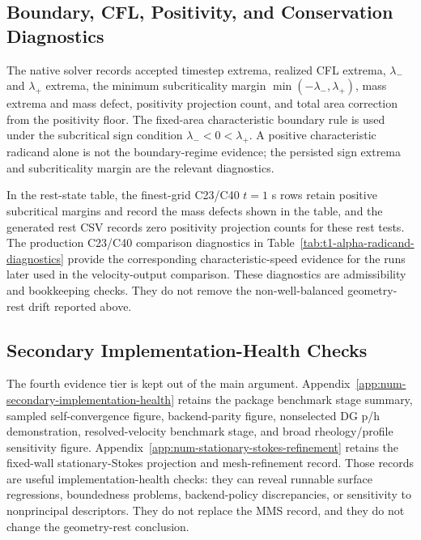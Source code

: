 \subsection{Boundary, CFL, Positivity, and Conservation Diagnostics}
\label{subsec:boundary-diagnostics}

The native solver records accepted timestep extrema, realized CFL extrema,
$\lambda_-$ and $\lambda_+$ extrema, the minimum subcriticality margin
$\min(-\lambda_-,\lambda_+)$, mass extrema and mass defect, positivity
projection count, and total area correction from the positivity floor. The
fixed-area characteristic boundary rule is used under the subcritical sign
condition $\lambda_-<0<\lambda_+$. A positive characteristic radicand alone is
not the boundary-regime evidence; the persisted sign extrema and subcriticality
margin are the relevant diagnostics.

In the rest-state table, the finest-grid C23/C40 $t=1$ s rows retain
positive subcritical margins and record the mass defects shown in the table, and the generated rest CSV records zero positivity projection counts for
these rest tests. The production C23/C40
comparison diagnostics in Table~\ref{tab:t1-alpha-radicand-diagnostics} provide
the corresponding characteristic-speed evidence for the runs later used in the
velocity-output comparison. These diagnostics are admissibility and bookkeeping
checks. They do not remove the non-well-balanced geometry-rest drift reported
above.

\subsection{Secondary Implementation-Health Checks}
\label{subsec:verification-summary}

The fourth evidence tier is kept out of the main argument. Appendix~\ref{app:num-secondary-implementation-health}
retains the package benchmark stage summary, sampled self-convergence figure,
backend-parity figure, nonselected DG p/h demonstration, resolved-velocity
benchmark stage, and broad rheology/profile sensitivity figure. Appendix~\ref{app:num-stationary-stokes-refinement}
retains the fixed-wall stationary-Stokes projection and mesh-refinement record.
Those records are useful implementation-health checks: they can reveal runnable
surface regressions, boundedness problems, backend-policy discrepancies, or
sensitivity to nonprincipal descriptors. They do not replace the MMS record, and
they do not change the geometry-rest conclusion.

\FloatBarrier
